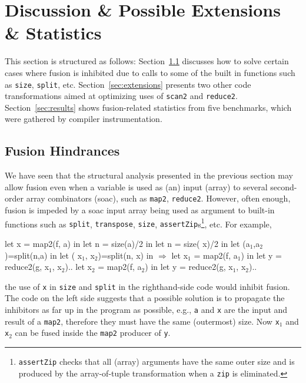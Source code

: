\documentclass{sigplanconf}  %
\newcommand{\emp}[1]{\textcolor{DikuRed}{ #1}}
\newcommand{\emphh}[1]{\textcolor{CosGreen}{ #1}}
\newcommand{\mymath}[1]{$ #1 $}
\newcommand{\myindx}[1]{_{#1}}
\begin{document}
\section{Discussion \& Possible Extensions \& Statistics}
\label{sec:Discuss}

This section is structured as follows:
Section~\ref{sec:inhibitors} discusses how to
solve certain cases where fusion is inhibited due to calls
to some of the built in functions such as {\tt size}, {\tt split}, etc.
Section~\ref{sec:extensions} presents two other code transformations
aimed at optimizing uses of {\tt scan2} and {\tt reduce2}.
Section~\ref{sec:results} shows fusion-related statistics
from five benchmarks, which were gathered by compiler instrumentation.

\subsection{Fusion Hindrances}
\label{sec:inhibitors}

We have seen that the structural analysis presented in the previous section
may allow fusion even when a variable is used as (an) input (array) to several
second-order array combinators ({\sc soac}), such as {\tt map2}, {\tt reduce2}.
However, often enough, fusion is impeded by a {\sc soac} input array being
used as argument to built-in functions such as {\tt split}, {\tt transpose},
{\tt size}, {\tt assertZip}s\footnote{
{\tt assertZip} checks that all (array) arguments have the same outer size 
and is produced by the array-of-tuple transformation when a {\tt zip} is
eliminated.
}, etc.   For example,
\begin{colorcode}
let \emphh{x} = map2(f, a)      in    let n = size(a)/2      in
let n = size(\emp{x})/2       in    let (a\mymath{\myindx{1}},a\mymath{\myindx{2}})=split(n,a) in 
let (\emphh{x\mymath{\myindx{1}}},\emphh{x\mymath{\myindx{2}}})=split(n,\emp{x})  in \mymath{\Rightarrow} let \emphh{x\mymath{\myindx{1}}} = map2(f, a\mymath{\myindx{1}})   in
let y = reduce2(g,\emphh{x\mymath{\myindx{1}}},\emphh{x\mymath{\myindx{2}}})..    let \emphh{x\mymath{\myindx{2}}} = map2(f, a\mymath{\myindx{2}})   in
                              let y = reduce2(g,\emphh{x\mymath{\myindx{1}}},\emphh{x\mymath{\myindx{2}}})..
\end{colorcode}
the use of {\tt x} in {\tt size} and {\tt split} in the righthand-side code 
would inhibit fusion.
The code on the left side suggests that a possible solution is to propagate 
the inhibitors as far up in the program as possible, e.g., {\tt a} and {\tt x} 
are the input and result of a {\tt map2}, therefore they must have the same 
(outermost) size. Now {\tt x$_1$} and {\tt x$_2$} can be fused inside the 
{\tt map2} producer of {\tt y}.
\end{document}
